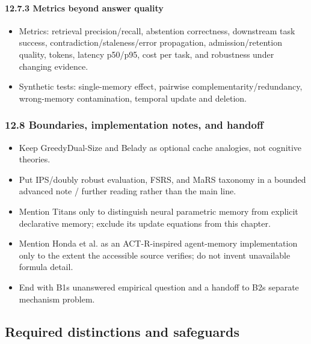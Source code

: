 \paragraph{12.7.3 Metrics beyond answer quality}\label{1273-metrics-beyond-answer-quality}

\begin{itemize}
\tightlist
\item
  Metrics: retrieval precision/recall, abstention correctness, downstream task success, contradiction/staleness/error propagation, admission/retention quality, tokens, latency p50/p95, cost per task, and robustness under changing evidence.
\item
  Synthetic tests: single-memory effect, pairwise complementarity/redundancy, wrong-memory contamination, temporal update and deletion.
\end{itemize}

\subsubsection{12.8 Boundaries, implementation notes, and handoff}\label{128-boundaries-implementation-notes-and-handoff}

\begin{itemize}
\tightlist
\item
  Keep GreedyDual-Size and Belady as optional cache analogies, not cognitive theories.
\item
  Put IPS/doubly robust evaluation, FSRS, and MaRS taxonomy in a bounded advanced note / further reading rather than the main line.
\item
  Mention Titans only to distinguish neural parametric memory from explicit declarative memory; exclude its update equations from this chapter.
\item
  Mention Honda et al. as an ACT-R-inspired agent-memory implementation only to the extent the accessible source verifies; do not invent unavailable formula detail.
\item
  End with B1\textquotesingle s unanswered empirical question and a handoff to B2\textquotesingle s separate mechanism problem.
\end{itemize}

\subsection{Required distinctions and safeguards}\label{required-distinctions-and-safeguards}

